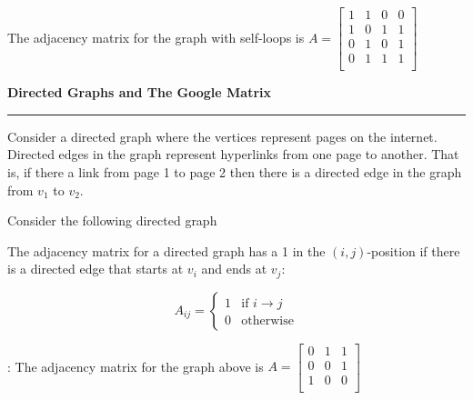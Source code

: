 \documentclass[12pt]{article}
\newcommand{\nin}{\noindent}
\newcommand{\vthree}{\vspace{3mm}}
\newcommand{\mymat}[1]{
\left[
\begin{array}{rrrrrrrrrrrrrrrrrrrrrrrrrrrrrrrrrrrrrrr}
#1
\end{array}
\right]
}
\begin{document}
\vthree

\nin The adjacency matrix for the graph with self-loops is $A =
\mymat{
1 & 1 & 0 & 0 \\
1 & 0 & 1 & 1 \\
0 & 1 & 0 & 1 \\
0 & 1 & 1 & 1 \\
}
$

\clearpage

\nin\Large{\bf Directed Graphs and The Google Matrix}\normalsize
\vspace{4mm}
\hrule

\vthree

\nin Consider a directed graph where the vertices represent pages on the internet.  Directed edges in the graph represent hyperlinks from one page to another.  That is, if there a link from page 1 to page 2 then there is a directed edge in the graph from $v_1$ to $v_2$.

\vthree

\nin Consider the following directed graph

\vthree

\begin{center}
\end{center}

\vthree

\nin The adjacency matrix for a directed graph has a 1 in the $(i,j)$-position if there is a directed edge that starts at $v_i$ and ends at $v_j$:

\[
A_{ij} =
\left\{
\begin{array}{rl}
1 & \textrm{if } i \rightarrow j \\
0 & \textrm{otherwise}
\end{array}
\right.
\]

\vthree

\nin {\bf Example 8}: The adjacency matrix for the graph above is $A =
\mymat{
0 & 1 & 1 \\
0 & 0 & 1 \\
1 & 0 & 0 \\
}
$
\end{document}
